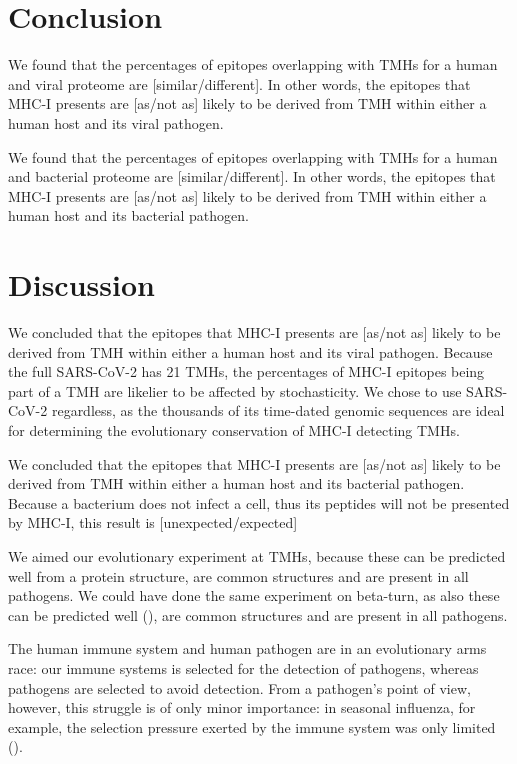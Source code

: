 \section{Conclusion}

We found that the percentages of epitopes overlapping 
with TMHs for a human and viral proteome are 
[similar/different]. In other words, the
epitopes that MHC-I presents are [as/not as] likely 
to be derived from TMH within either a human host and its viral pathogen.

We found that the percentages of epitopes overlapping 
with TMHs for a human and bacterial proteome are 
[similar/different]. In other words, the
epitopes that MHC-I presents are [as/not as] likely 
to be derived from TMH within either a human host and its bacterial pathogen.

\section{Discussion}

We concluded that the
epitopes that MHC-I presents are [as/not as] likely 
to be derived from TMH within either a human host and its viral pathogen.
Because the full SARS-CoV-2 has 21 TMHs, the percentages
of MHC-I epitopes being part of a TMH are likelier to be affected by
stochasticity. We chose to use SARS-CoV-2 regardless, as the thousands
of its time-dated genomic sequences are ideal for determining the 
evolutionary conservation of MHC-I detecting TMHs. 

We concluded that the
epitopes that MHC-I presents are [as/not as] likely 
to be derived from TMH within either a human host and its bacterial pathogen.
Because a bacterium does not infect a cell, thus its peptides
will not be presented by MHC-I, this result is [unexpected/expected]

We aimed our evolutionary experiment at TMHs, because these can
be predicted well from a protein structure,
are common structures and are present in all pathogens. 
We could have done the same experiment on beta-turn,
as also these can be predicted well (\cite{petersen2010netturnp}),
are common structures and are present in all pathogens.

The human immune system and human pathogen are in an evolutionary
arms race: our immune systems is selected for the detection
of pathogens, whereas pathogens are selected to avoid detection.
From a pathogen's point of view, however, this struggle 
is of only minor importance:
in seasonal influenza, for example, the selection pressure
exerted by the immune system was only limited (\cite{han2019individual}).

